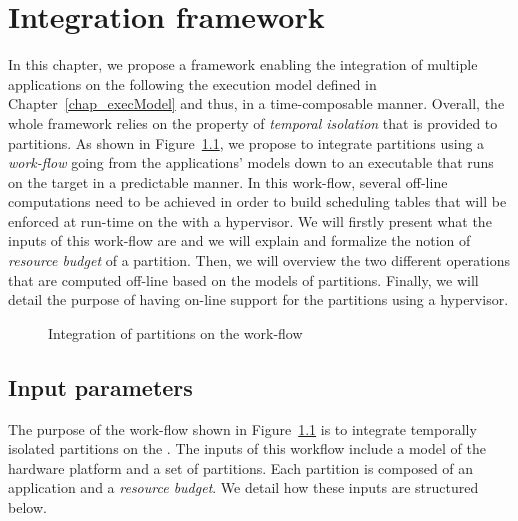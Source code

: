 \documentclass[main.tex]{subfiles}
\begin{document}
\chapter{Integration framework}
\thispagestyle{chapstyle}
\label{chap_framework}
\minitoc

In this chapter, we propose a framework enabling the integration of multiple applications on the \mppalong following the execution model defined in Chapter~\ref{chap_execModel} and thus, in a time-composable manner. Overall, the whole framework relies on the property of \emph{temporal isolation} that is provided to partitions. As shown in Figure~\ref{fig_framework_workFlow}, we propose to integrate partitions using a \emph{work-flow} going from the applications' models down to an executable that runs on the target in a predictable manner. In this work-flow, several off-line computations need to be achieved in order to build scheduling tables that will be enforced at run-time on the \mppalong with a hypervisor. 
We will firstly present what the inputs of this work-flow are and we will explain and formalize the notion of \emph{resource budget} of a partition. Then, we will overview the two different operations that are computed off-line based on the models of partitions. Finally, we will detail the purpose of having on-line support for the partitions using a hypervisor. 

\begin{figure}
    \centering
    \scalebox{0.9}{}
    \caption{Integration of partitions on the \mppalong work-flow}
    \label{fig_framework_workFlow}
\end{figure}


\section{Input parameters}
The purpose of the work-flow shown in Figure~\ref{fig_framework_workFlow} is to integrate temporally isolated partitions on the \mppalong. The inputs of this workflow include a model of the hardware platform and a set of partitions. Each partition is composed of an application and a \emph{resource budget}. We detail how these inputs are structured below. 
\end{document}
